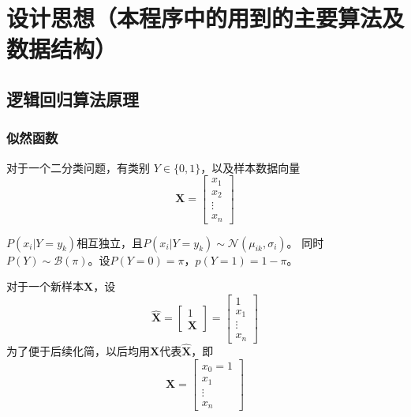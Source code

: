 \section{设计思想（本程序中的用到的主要算法及数据结构）}

\subsection{逻辑回归算法原理}

\subsubsection{似然函数}

对于一个二分类问题，有类别 $Y \in \{ 0, 1 \}$，以及样本数据向量
\begin{equation}
    \mathbf{X} =
    \begin{bmatrix}
        x_1 \\ x_2 \\ \vdots \\ x_n
    \end{bmatrix}
\end{equation}

$P(x_i | Y = y_k)$相互独立，且$P(x_i | Y = y_k) \sim \mathcal{N} (\mu_{ik}, \sigma_i)$。
同时$P(Y) \sim \mathcal{B} (\pi)$。设$P(Y = 0) = \pi$，$p(Y = 1) = 1 - \pi$。

对于一个新样本$\mathbf{X}$，设
\begin{equation}
    \mathbf{\hat{X}}=
    \begin{bmatrix}
        1 \\ \mathbf{X}
    \end{bmatrix}=
    \begin{bmatrix}
        1 \\ x_1 \\ \vdots \\ x_n
    \end{bmatrix}
\end{equation}
为了便于后续化简，以后均用$\mathbf{X}$代表$\mathbf{\hat{X}}$，即
\begin{equation}
    \mathbf{X}=
    \begin{bmatrix}
        x_0=1 \\ x_1 \\ \vdots \\ x_n
    \end{bmatrix}
\end{equation}

